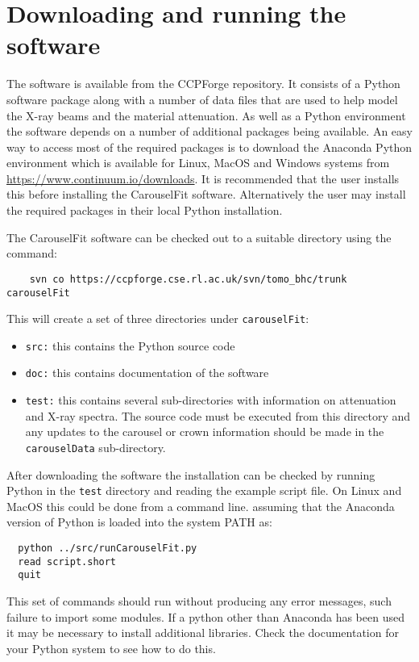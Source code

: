 \documentclass[a4paper]{article}
\begin{document}
\section{Downloading and running the software}

The software is available from the CCPForge repository.
It consists of a Python software package along with a number of data files that are used to help model the X-ray
beams and the material attenuation.
As well as a Python environment the software depends on a number of additional packages being available.
An easy way to access most of the required packages is to download the Anaconda Python environment which is
available for Linux, MacOS and Windows systems from \url{https://www.continuum.io/downloads}.
It is recommended that the user installs this before installing the CarouselFit software.
Alternatively the user may install the required packages in their local Python installation.

The CarouselFit software can be checked out to a suitable directory using the command:
\begin{verbatim}
    svn co https://ccpforge.cse.rl.ac.uk/svn/tomo_bhc/trunk carouselFit
\end{verbatim}
This will create a set of three directories under \texttt{carouselFit}:
\begin{itemize}
\item \texttt{src:} this contains the Python source code
\item \texttt{doc:} this contains documentation of the software
\item \texttt{test:} this contains several sub-directories with information on attenuation and X-ray spectra.
The source code must be executed from this directory and any updates to the carousel or crown information
should be made in the \texttt{carouselData} sub-directory.
\end{itemize}

After downloading the software the installation can be checked by running Python in the \texttt{test} directory
and reading the example script file.
On Linux and MacOS this could be done from a command line. assuming that the Anaconda version of Python is loaded into
the system PATH as:
\begin{verbatim}
  python ../src/runCarouselFit.py
  read script.short
  quit
\end{verbatim}

This set of commands should run without producing any error messages, such failure to import some modules.
If a python other than Anaconda has been used it may be necessary to install additional libraries.
Check the documentation for your Python system to see how to do this.
\end{document}
